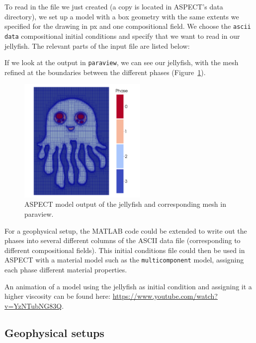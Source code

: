 \documentclass{article}
\newcommand{\aspect}{\textsc{ASPECT}}
\begin{document}
To read in the file we just created (a copy is located in \aspect{}'s data directory), 
we set up a model with a box geometry with the same extents we specified for the drawing in px 
and one compositional field. We choose the \texttt{ascii data} compositional initial conditions and specify that we 
want to read in our jellyfish. The relevant parts of the input file are listed below:


If we look at the output in \texttt{paraview}, we can see our jellyfish, with the mesh refined at the 
boundaries between the different phases (Figure~\ref{fig:jelly-paraview}). 
\begin{figure}[tb]
    \centering
    \includegraphics[width=0.55\textwidth]{cookbooks/geomio/jelly-paraview.pdf}
    \caption{\aspect{} model output of the jellyfish and corresponding mesh in paraview.}
    \label{fig:jelly-paraview}
\end{figure}

For a geophysical setup, the MATLAB code could be extended to write out the phases into several different columns 
of the ASCII data file (corresponding to different compositional fields). This initial conditions file could then be 
used in \aspect{} with a material model such as the \texttt{multicomponent} model, assigning each phase different 
material properties. 

An animation of a model using the jellyfish as initial condition and assigning it a higher viscosity can be found here: \url{https://www.youtube.com/watch?v=YzNTubNG83Q}. 

\subsection{Geophysical setups}
\label{sec:cookbooks-geophysical}
\end{document}
